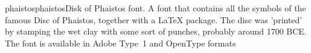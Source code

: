 \documentclass{ddltxtyp}
\begin{document}
\begin{package}{phaistos}{phaistos}{Disk of Phaistos font.}
A font that contains all the symbols of the famous Disc of
Phaistos, together with a {\LaTeX} package. The disc was 'printed'
by stamping the wet clay with some sort of punches, probably
around 1700 BCE. The font is available in Adobe Type~1 and
OpenType formats %
\end{package}

\end{document}
